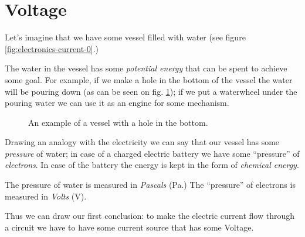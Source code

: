 \documentclass[../sparc.tex]{subfiles}
\begin{document}
\section{Voltage}

Let's imagine that we have some vessel filled with water (see figure
\ref{fig:electronics-current-0}.)


The water in the vessel has some \emph{potential energy} that can be spent to
achieve some goal.  For example, if we make a hole in the bottom of the vessel
the water will be pouring down (as can be seen on
fig. \ref{fig:electronics-current-1}); if we put a waterwheel under the pouring
water we can use it as an engine for some mechanism.

\begin{figure}[ht]
  \centering
  \caption{An example of a vessel with a hole in the bottom.}
  \label{fig:electronics-current-1}
\end{figure}

Drawing an analogy with the electricity we can say that our vessel has some
\emph{pressure} of water; in case of a charged electric battery we have some
``pressure'' of \emph{electrons}.  In case of the battery the energy is kept in
the form of \emph{chemical energy}.

The pressure of water is measured in \emph{Pascals} (Pa.)  The ``pressure'' of
electrons is measured in \emph{Volts} (V).

Thus we can draw our first conclusion: to make the electric current flow through
a circuit we have to have some current source that has some Voltage.
\end{document}

